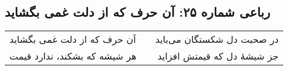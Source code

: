 \begin{center}
\section*{رباعی شماره ۲۵: آن حرف که از دلت غمی بگشاید}
\label{sec:025}
\begin{longtable}{l p{0.5cm} r}
آن حرف که از دلت غمی بگشاید
&&
در صحبت دل شکستگان می‌باید
\\
هر شیشه که بشکند، ندارد قیمت
&&
جز شیشهٔ دل که قیمتش افزاید
\\
\end{longtable}
\end{center}
